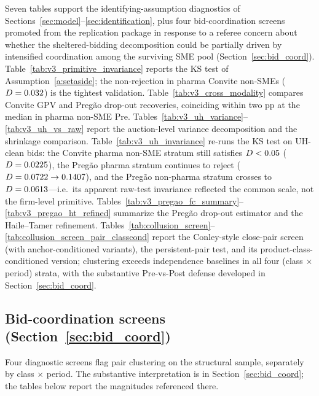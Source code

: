 Seven tables support the identifying-assumption diagnostics of Sections~\ref{sec:model}--\ref{sec:identification}, plus four bid-coordination screens promoted from the replication package in response to a referee concern about whether the sheltered-bidding decomposition could be partially driven by intensified coordination among the surviving SME pool (Section~\ref{sec:bid_coord}). Table~\ref{tab:v3_primitive_invariance} reports the KS test of Assumption~\ref{a:setaside}; the non-rejection in pharma Convite non-SMEs ($D=0.032$) is the tightest validation. Table~\ref{tab:v3_cross_modality} compares Convite GPV and Preg\~ao drop-out recoveries, coinciding within two pp at the median in pharma non-SME Pre. Tables~\ref{tab:v3_uh_variance}--\ref{tab:v3_uh_vs_raw} report the auction-level variance decomposition and the shrinkage comparison. Table~\ref{tab:v3_uh_invariance} re-runs the KS test on UH-clean bids: the Convite pharma non-SME stratum still satisfies $D < 0.05$ ($D = 0.0225$), the Preg\~ao pharma stratum continues to reject ($D = 0.0722 \to 0.1407$), and the Preg\~ao non-pharma stratum crosses to $D = 0.0613$---i.e.\ its apparent raw-test invariance reflected the common scale, not the firm-level primitive. Tables~\ref{tab:v3_pregao_fc_summary}--\ref{tab:v3_pregao_ht_refined} summarize the Preg\~ao drop-out estimator and the Haile--Tamer refinement. Tables~\ref{tab:collusion_screen}--\ref{tab:collusion_screen_pair_classcond} report the Conley-style close-pair screen (with anchor-conditioned variants), the \citet{bajariye2003} persistent-pair test, and its product-class-conditioned version; clustering exceeds independence baselines in all four (class $\times$ period) strata, with the substantive Pre-vs-Post defense developed in Section~\ref{sec:bid_coord}.









\subsection*{Bid-coordination screens (Section~\ref{sec:bid_coord})}\label{app:bid_coord}
Four diagnostic screens flag pair clustering on the structural sample, separately by class $\times$ period. The substantive interpretation is in Section~\ref{sec:bid_coord}; the tables below report the magnitudes referenced there.





